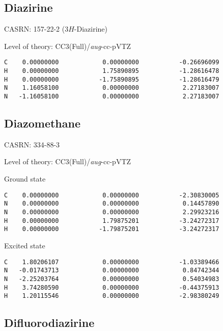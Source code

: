 \documentclass[journal=jctcce,manuscript=article,layout=traditional]{achemso}
\newcommand{\AVTZ}{\emph{aug}-cc-pVTZ}
\begin{document}
\subsection{Diazirine}

CASRN: 157-22-2 (3$H$-Diazirine)

\begin{singlespace}
\noindent Level of theory: CC3(Full)/{\AVTZ}
\begin{verbatim}
C    0.00000000            0.00000000           -0.26696099
H    0.00000000            1.75890895           -1.28616478
H    0.00000000           -1.75890895           -1.28616479
N    1.16058100            0.00000000            2.27183007
N   -1.16058100            0.00000000            2.27183007
\end{verbatim}
\end{singlespace}

\subsection{Diazomethane}

CASRN: 334-88-3

\begin{singlespace}
\noindent Level of theory: CC3(Full)/{\AVTZ}
\end{singlespace}

\begin{singlespace}
\noindent Ground state
\begin{verbatim}
C    0.00000000            0.00000000           -2.30830005
N    0.00000000            0.00000000            0.14457890
N    0.00000000            0.00000000            2.29923216
H    0.00000000            1.79875201           -3.24272317
H    0.00000000           -1.79875201           -3.24272317
\end{verbatim}
\end{singlespace}

\begin{singlespace}
\noindent Excited state
\begin{verbatim}
C    1.80206107            0.00000000           -1.03389466
N   -0.01743713            0.00000000            0.84742344
N   -2.25203764            0.00000000            0.54034983  
H    3.74280590            0.00000000           -0.44375913
H    1.20115546            0.00000000           -2.98380249
\end{verbatim}
\end{singlespace}

\subsection{Difluorodiazirine}
\end{document}
